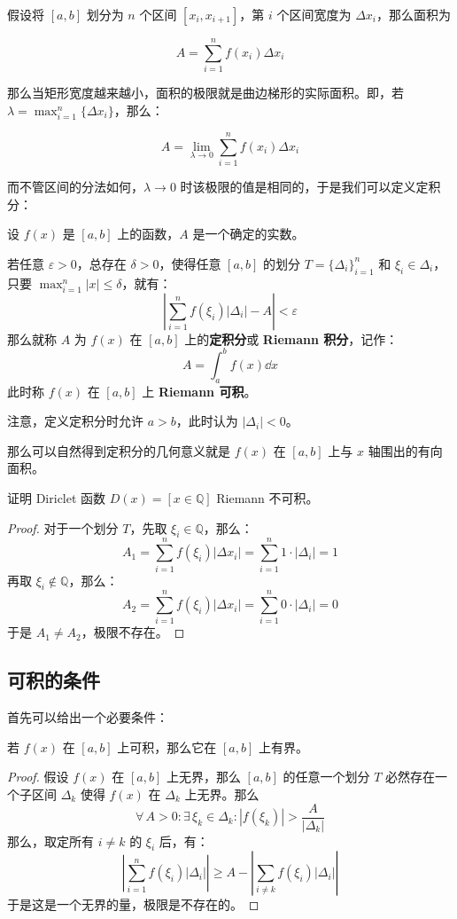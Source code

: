 假设将 $[a, b]$ 划分为 $n$ 个区间 $[x_i, x_{i+1}]$，第 $i$ 个区间宽度为 $\Delta x_i$，那么面积为

$$
A = \sum_{i=1}^n f(x_i) \Delta x_i
$$

那么当矩形宽度越来越小，面积的极限就是曲边梯形的实际面积。即，若 $\lambda = \max_{i=1}^n \{\Delta x_i\}$，那么：

$$
A = \lim_{\lambda \to 0} \sum_{i=1}^n f(x_i) \Delta x_i
$$

而不管区间的分法如何，$\lambda \to 0$ 时该极限的值是相同的，于是我们可以定义定积分：

\begin{definition}
	设 $f(x)$ 是 $[a, b]$ 上的函数，$A$ 是一个确定的实数。

	若任意 $\varepsilon > 0$，总存在 $\delta > 0$，使得任意 $[a, b]$ 的划分 $T = \{\Delta_i\}_{i=1}^n$ 和 $\xi_i \in \Delta_i$，只要 $\max_{i=1}^n |x| \le \delta$，就有：
	$$
	\left|\sum_{i=1}^n f(\xi_i) |\Delta_i| - A\right| < \varepsilon
	$$
	那么就称 $A$ 为 $f(x)$ 在 $[a, b]$ 上的\textbf{定积分}或 \textbf{Riemann 积分}，记作：
	$$
	A = \int_a^b f(x) \dd x
	$$
	此时称 $f(x)$ 在 $[a, b]$ 上 \textbf{Riemann 可积}。

	注意，定义定积分时允许 $a > b$，此时认为 $|\Delta_i| < 0$。
\end{definition}

那么可以自然得到定积分的几何意义就是 $f(x)$ 在 $[a, b]$ 上与 $x$ 轴围出的有向面积。

\begin{example}
	证明 Diriclet 函数 $D(x) = [x \in \mathbb{Q}]$ Riemann 不可积。

	\begin{proof}
		对于一个划分 $T$，先取 $\xi_i \in \mathbb{Q}$，那么：
		$$
		A_1 = \sum_{i=1}^n f(\xi_i) |\Delta x_i| = \sum_{i=1}^n 1 \cdot |\Delta_i| = 1
		$$
		再取 $\xi_i \notin \mathbb{Q}$，那么：
		$$
		A_2 = \sum_{i=1}^n f(\xi_i) |\Delta x_i| = \sum_{i=1}^n 0 \cdot |\Delta_i| = 0
		$$
		于是 $A_1 \neq A_2$，极限不存在。
	\end{proof}
\end{example}

\subsection{可积的条件}

首先可以给出一个必要条件：

\begin{theorem}
	若 $f(x)$ 在 $[a, b]$ 上可积，那么它在 $[a, b]$ 上有界。

	\begin{proof}
		假设 $f(x)$ 在 $[a, b]$ 上无界，那么 $[a, b]$ 的任意一个划分 $T$ 必然存在一个子区间 $\Delta_k$ 使得 $f(x)$ 在 $\Delta_k$ 上无界。那么
		$$
		\forall\,A > 0: \exists\,\xi_k \in \Delta_k: |f(\xi_k)| > \frac{A}{|\Delta_k|}
		$$
		那么，取定所有 $i \neq k$ 的 $\xi_i$ 后，有：
		$$
		\left| \sum_{i=1}^n f(\xi_i) |\Delta_i| \right| \ge A - \left|\sum_{i \neq k} f(\xi_i) |\Delta_i| \right| 
		$$
		于是这是一个无界的量，极限是不存在的。
	\end{proof}
\end{theorem}

